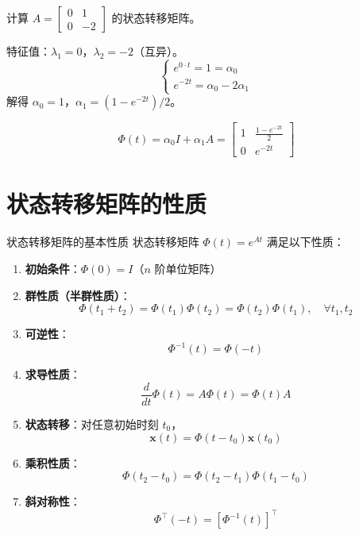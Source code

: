 \begin{example}
计算 $A = \begin{bmatrix} 0 & 1 \\ 0 & -2 \end{bmatrix}$ 的状态转移矩阵。

特征值：$\lambda_1=0$，$\lambda_2=-2$（互异）。
\[
\begin{cases}
e^{0\cdot t} = 1 = \alpha_0 \\
e^{-2t} = \alpha_0 - 2\alpha_1
\end{cases}
\]
解得 $\alpha_0 = 1$，$\alpha_1 = (1 - e^{-2t})/2$。

\[
\Phi(t) = \alpha_0 I + \alpha_1 A = \begin{bmatrix} 1 & \frac{1-e^{-2t}}{2} \\ 0 & e^{-2t} \end{bmatrix}
\]
\end{example}

\section{状态转移矩阵的性质}

\begin{myTheorem}{状态转移矩阵的基本性质}
状态转移矩阵 $\Phi(t) = e^{At}$ 满足以下性质：

\begin{enumerate}
    \item \textbf{初始条件}：$\Phi(0) = I$（$n$ 阶单位矩阵）
    \item \textbf{群性质（半群性质）}：
    \[
    \Phi(t_1 + t_2) = \Phi(t_1)\Phi(t_2) = \Phi(t_2)\Phi(t_1),\quad \forall t_1, t_2
    \]
    \item \textbf{可逆性}：
    \[
    \Phi^{-1}(t) = \Phi(-t)
    \]
    \item \textbf{求导性质}：
    \[
    \frac{d}{dt}\Phi(t) = A\Phi(t) = \Phi(t)A
    \]
    \item \textbf{状态转移}：对任意初始时刻 $t_0$，
    \[
    \mathbf{x}(t) = \Phi(t - t_0)\mathbf{x}(t_0)
    \]
    \item \textbf{乘积性质}：
    \[
    \Phi(t_2 - t_0) = \Phi(t_2 - t_1)\Phi(t_1 - t_0)
    \]
    \item \textbf{斜对称性}：
    \[
    \Phi^{\top}(-t) = [\Phi^{-1}(t)]^{\top}
    \]
\end{enumerate}
\end{myTheorem}

